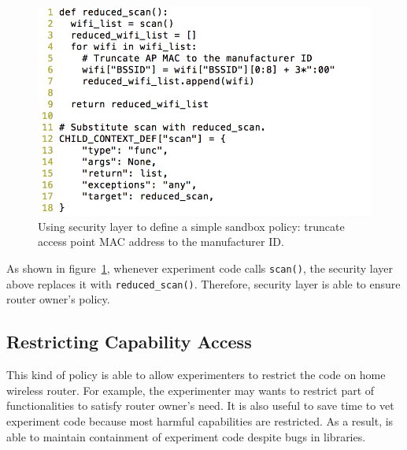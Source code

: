 \begin{figure}%
\centering
\includegraphics[width=0.8\columnwidth]{figure/example.png}
\caption{Using security layer to define a simple sandbox policy: truncate access point MAC address to the manufacturer ID.}
\label{fig-examplecode}
\end{figure}

As shown in figure~\ref{fig-examplecode}, whenever experiment code calls \texttt{scan()}, the security layer above replaces it with \texttt{reduced\_scan()}. Therefore, security layer is able to ensure router owner's policy.

\subsection{Restricting Capability Access}
This kind of policy is able to allow experimenters to restrict the code on home wireless router. For example, the experimenter may wants to restrict part of functionalities to satisfy router owner's need. It is also useful to save time to vet experiment code because most harmful capabilities are restricted. As a result, \sysname is able to maintain containment of experiment code despite bugs in libraries.
 